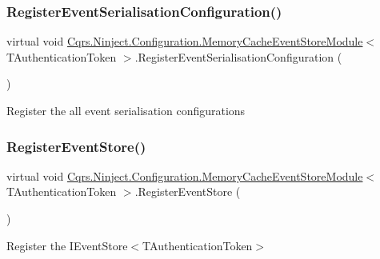 \subsubsection{\texorpdfstring{Register\+Event\+Serialisation\+Configuration()}{RegisterEventSerialisationConfiguration()}}
{\footnotesize\ttfamily virtual void \hyperlink{classCqrs_1_1Ninject_1_1Configuration_1_1MemoryCacheEventStoreModule}{Cqrs.\+Ninject.\+Configuration.\+Memory\+Cache\+Event\+Store\+Module}$<$ T\+Authentication\+Token $>$.Register\+Event\+Serialisation\+Configuration (\begin{DoxyParamCaption}{ }\end{DoxyParamCaption})\hspace{0.3cm}{\ttfamily [virtual]}}



Register the all event serialisation configurations 

\mbox{\label{classCqrs_1_1Ninject_1_1Configuration_1_1MemoryCacheEventStoreModule_a085e95adbb290708cb8912c82605782c_a085e95adbb290708cb8912c82605782c}} 
\subsubsection{\texorpdfstring{Register\+Event\+Store()}{RegisterEventStore()}}
{\footnotesize\ttfamily virtual void \hyperlink{classCqrs_1_1Ninject_1_1Configuration_1_1MemoryCacheEventStoreModule}{Cqrs.\+Ninject.\+Configuration.\+Memory\+Cache\+Event\+Store\+Module}$<$ T\+Authentication\+Token $>$.Register\+Event\+Store (\begin{DoxyParamCaption}{ }\end{DoxyParamCaption})\hspace{0.3cm}{\ttfamily [virtual]}}



Register the I\+Event\+Store$<$\+T\+Authentication\+Token$>$ 

